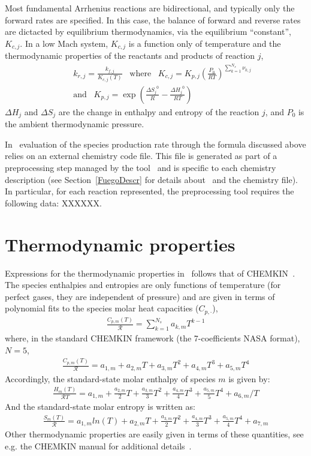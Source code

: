 Most fundamental Arrhenius reactions are bidirectional, and typically only the forward rates are specified. In this case, the balance of forward and reverse rates are dictacted by equilibrium thermodynamics, via the equilibrium ``constant'', $K_{c,j}$.  In a low Mach system, $K_{c,j}$ is a function only of temperature and the thermodynamic properties of the reactants and products of reaction $j$,
\begin{eqnarray*}
&&k_{r,j} = \frac{k_{f,j}}{K_{c,j}(T)} \;\;\; \mbox{where} \;\;\; K_{c,j}=K_{p,j} \left( \frac{P_{0}}{RT} \right)^{\sum_{k=1}^{N_s} \nu_{k,j}}
\\
&&\mbox{and} \;\;\; K_{p,j}=\exp \left( \frac{\Delta {S_j}^{0}}{R} - \frac{\Delta {H_j}^{0}}{RT} \right)
\end{eqnarray*}
$\Delta H_j$ and $\Delta S_j$ are the change in enthalpy and entropy of the reaction $j$, and $P_0$ is the ambient thermodynamic pressure.

In \pelelm\ evaluation of the species production rate through the formula discussed above relies on an external chemistry code file. This file is generated as part of a preprocessing step managed by the tool \fuego\, and is specific to each chemistry description (see Section~\ref{FuegoDescr} for details about \fuego\ and the chemistry file). In particular, for each reaction represented, the preprocessing tool requires the following data: XXXXXX.


\section{Thermodynamic properties}
\label{ThermoProp}
Expressions for the thermodynamic properties in \pelelm\ follows that of CHEMKIN~\cite{Kee:1989}. The species enthalpies and entropies are only functions  of  temperature (for perfect gases, they are independent of pressure)  and  are  given  in  terms  of  polynomial  fits  to  the species molar heat capacities ($C_{p,\cdot}$),
\begin{eqnarray*}
\frac{C_{p,m}(T)}{\mathcal{R}} = \sum_{k=1}^{N_s} a_{k,m}T^{k-1}
\end{eqnarray*}
where, in the standard CHEMKIN framework (the 7-coefficients NASA format), $N =5$,
\begin{eqnarray}
\frac{C_{p,m}(T)}{\mathcal{R}} = a_{1,m} + a_{2,m} T + a_{3,m} T^2 + a_{4,m} T^3 + a_{5,m} T^4
\end{eqnarray}
Accordingly, the standard-state molar enthalpy of species $m$ is given by:
\begin{eqnarray}
\frac{H_{m}(T)}{\mathcal{R}T} = a_{1,m} +\frac{a_{2,m}}{2} T   + \frac{a_{3,m}}{3} T^2 +  \frac{a_{4,m}}{4} T^3 + \frac{ a_{5,m}}{5} T^4 + a_{6,m}/T
\end{eqnarray}
And the standard-state molar entropy is written as:
\begin{eqnarray}
\frac{S_{m}(T)}{\mathcal{R}} = a_{1,m}ln(T) + {a_{2,m}} T   + \frac{a_{3,m}}{2} T^2 +  \frac{a_{4,m}}{3} T^3 + \frac{ a_{5,m}}{4} T^4 + a_{7,m}
\end{eqnarray}
Other thermodynamic properties are easily given in terms of these quantities, see e.g. the CHEMKIN manual for additional details~\cite{Kee:1989}.

